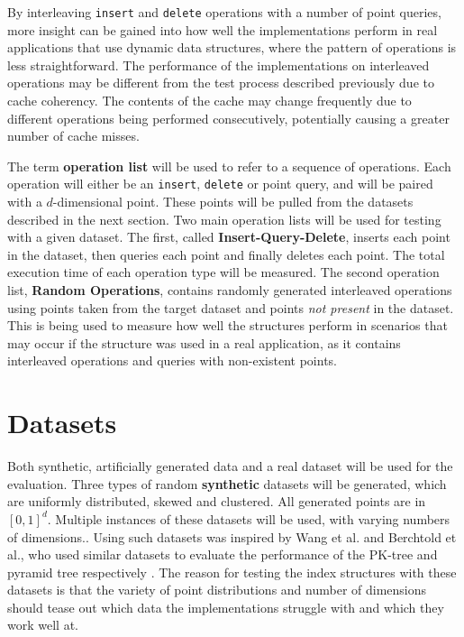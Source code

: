 By interleaving \texttt{insert} and \texttt{delete} operations with a number of point queries, more insight can be gained into how well the implementations perform in real applications that use dynamic data structures, where the pattern of operations is less straightforward. The performance of the implementations on interleaved operations may be different from the test process described previously due to cache coherency. The contents of the cache may change frequently due to different operations being performed consecutively, potentially causing a greater number of cache misses.

The term \textbf{operation list} will be used to refer to a sequence of operations. Each operation will either be an \texttt{insert}, \texttt{delete} or point query, and will be paired with a $d$-dimensional point. These points will be pulled from the datasets described in the next section. Two main operation lists will be used for testing with a given dataset. The first, called \textbf{Insert-Query-Delete}, inserts each point in the dataset, then queries each point and finally deletes each point. The total execution time of each operation type will be measured. The second operation list, \textbf{Random Operations}, contains randomly generated interleaved operations using points taken from the target dataset and points \textit{not present} in the dataset. This is being used to measure how well the structures perform in scenarios that may occur if the structure was used in a real application, as it contains interleaved operations and queries with non-existent points.


\section{Datasets}
\label{sec:datasets}

Both synthetic, artificially generated data and a real dataset will be used for the evaluation. Three types of random \textbf{synthetic} datasets will be generated, which are uniformly distributed, skewed and clustered. All generated points are in $[0,1]^d$. Multiple instances of these datasets will be used, with varying numbers of dimensions.. Using such datasets was inspired by Wang et al. and Berchtold et al., who used similar datasets to evaluate the performance of the PK-tree and pyramid tree respectively \cite{pk-tree, pyramid-tree}. The reason for testing the index structures with these datasets is that the variety of point distributions and number of dimensions should tease out which data the implementations struggle with and which they work well at.


